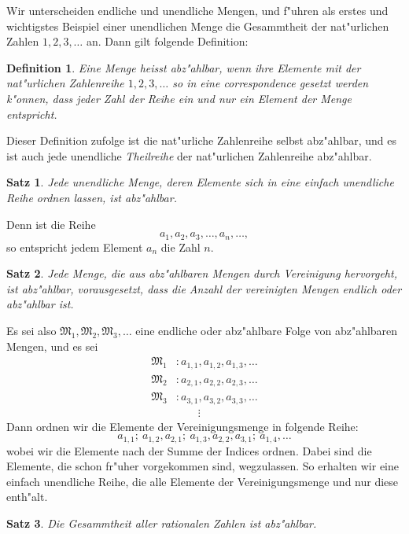 \documentclass[10pt,a4paper]{article}
\theoremstyle{weberstyle}
\newtheorem{satz}{Satz}[section]
\newtheorem{definition}{Definition}[section]
\begin{document}
Wir unterscheiden endliche und unendliche Mengen, und f"uhren als erstes
und wichtigstes Beispiel einer unendlichen Menge die Gesammtheit der
nat"urlichen Zahlen $1,2,3,\dots$ an. Dann gilt folgende Definition:

\begin{definition}
Eine Menge heisst \emph{abz"ahlbar}, wenn ihre Elemente mit der nat"urlichen
Zahlenreihe $1,2,3,\dots$ so in eine correspondence gesetzt werden k"onnen,
dass jeder Zahl der Reihe ein und nur ein Element der Menge entspricht.
\end{definition}

Dieser Definition zufolge ist die nat"urliche Zahlenreihe selbst
abz"ahlbar, und es ist auch jede unendliche \emph{Theilreihe} der
nat"urlichen Zahlenreihe abz"ahlbar.

\begin{satz}
Jede unendliche Menge, deren Elemente sich in eine einfach unendliche
Reihe ordnen lassen, ist abz"ahlbar.
\end{satz}

Denn ist die Reihe
\[
a_1,a_2,a_3,\dots,a_n,\dots,
\]
so entspricht jedem Element $a_n$ die Zahl $n$.

\begin{satz}
Jede Menge, die aus abz"ahlbaren Mengen durch Vereinigung hervorgeht, ist
abz"ahlbar, vorausgesetzt, dass die Anzahl der vereinigten Mengen endlich
oder abz"ahlbar ist.
\end{satz}

Es sei also $\mathfrak{M}_1,\mathfrak{M}_2,\mathfrak{M}_3,\dots$ eine endliche
oder abz"ahlbare Folge von abz"ahlbaren Mengen, und es sei
\begin{align*}
\mathfrak{M}_1 &: a_{1,1},a_{1,2},a_{1,3},\dots\\
\mathfrak{M}_2 &: a_{2,1},a_{2,2},a_{2,3},\dots\\
\mathfrak{M}_3 &: a_{3,1},a_{3,2},a_{3,3},\dots\\
&\qquad\vdots
\end{align*}
Dann ordnen wir die Elemente der Vereinigungsmenge in folgende Reihe:
\[
a_{1,1};\ a_{1,2},a_{2,1};\ a_{1,3},a_{2,2},a_{3,1};\ a_{1,4},\dots
\]
wobei wir die Elemente nach der Summe der Indices ordnen. Dabei sind die
Elemente, die schon fr"uher vorgekommen sind, wegzulassen. So erhalten wir
eine einfach unendliche Reihe, die alle Elemente der Vereinigungsmenge und
nur diese enth"alt.

\begin{satz}
Die Gesammtheit aller rationalen Zahlen ist abz"ahlbar.
\end{satz}
\end{document}
